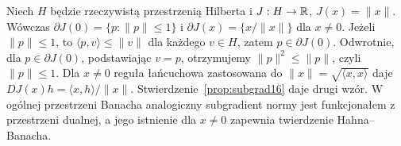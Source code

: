 \begin{przyklad}
\label{ex:norm-subgrad16}
Niech $H$ będzie rzeczywistą przestrzenią Hilberta
i $J:H\to\mathbb R$, $J(x)=\|x\|$. Wówczas
$\partial J(0)=\{p:\|p\|\le1\}$ i
$\partial J(x)=\{x/\|x\|\}$ dla $x\ne0$.
Jeżeli $\|p\|\le1$, to $\langle p,v\rangle\le\|v\|$
dla każdego $v\in H$, zatem $p\in\partial J(0)$.
Odwrotnie, dla $p\in\partial J(0)$, podstawiając $v=p$,
otrzymujemy $\|p\|^2\le\|p\|$, czyli $\|p\|\le1$.
Dla $x\ne0$ reguła łańcuchowa zastosowana do
$\|x\|=\sqrt{\langle x,x\rangle}$ daje
$DJ(x)h=\langle x,h\rangle/\|x\|$.
Stwierdzenie~\ref{prop:subgrad16} daje drugi wzór.
W ogólnej przestrzeni Banacha analogiczny subgradient normy
jest funkcjonałem z przestrzeni dualnej, a jego istnienie
dla $x\ne0$ zapewnia twierdzenie Hahna--Banacha.
\end{przyklad}

